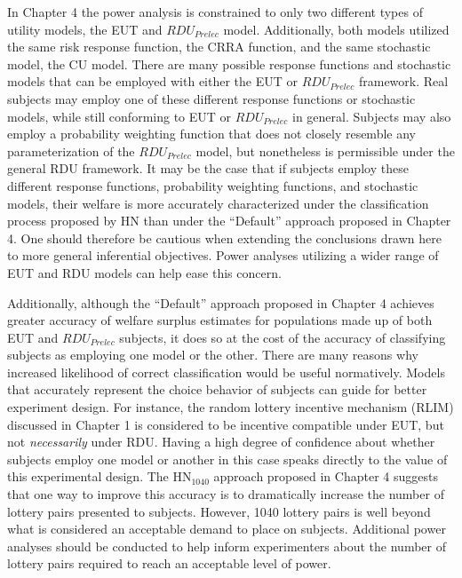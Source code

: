 \documentclass[../main.tex]{subfiles}
\begin{document}
In Chapter 4 the power analysis is constrained to only two different types of utility models, the EUT and $\mathit{RDU_{Prelec}}$ model.
Additionally, both models utilized the same risk response function, the CRRA function, and the same stochastic model, the CU model.
There are many possible response functions and stochastic models that can be employed with either the EUT or $\mathit{RDU_{Prelec}}$ framework.
Real subjects may employ one of these different response functions or stochastic models, while still conforming to EUT or $\mathit{RDU_{Prelec}}$ in general.
Subjects may also employ a probability weighting function that does not closely resemble any parameterization of the $\mathit{RDU_{Prelec}}$ model, but nonetheless is permissible under the general RDU framework.
It may be the case that if subjects employ these different response functions, probability weighting functions, and stochastic models, their welfare is more accurately characterized under the classification process proposed by HN than under the \enquote{Default} approach proposed in Chapter 4.
One should therefore be cautious when extending the conclusions drawn here to more general inferential objectives.
Power analyses utilizing a wider range of EUT and RDU models can help ease this concern.

Additionally, although the \enquote{Default} approach proposed in Chapter 4 achieves greater accuracy of welfare surplus estimates for populations made up of both EUT and $\mathit{RDU_{Prelec}}$ subjects, it does so at the cost of the accuracy of classifying subjects as employing one model or the other.
There are many reasons why increased likelihood of correct classification would be useful normatively.
Models that accurately represent the choice behavior of subjects can guide for better experiment design.
For instance, the random lottery incentive mechanism (RLIM) discussed in Chapter 1 is considered to be incentive compatible under EUT, but not \textit{necessarily} under RDU.
Having a high degree of confidence about whether subjects employ one model or another in this case speaks directly to the value of this experimental design.
The $\text{HN}_{1040}$ approach proposed in Chapter 4 suggests that one way to improve this accuracy is to dramatically increase the number of lottery pairs presented to subjects.
However, 1040 lottery pairs is well beyond what is considered an acceptable demand to place on subjects.
Additional power analyses should be conducted to help inform experimenters about the number of lottery pairs required to reach an acceptable level of power.
\end{document}

